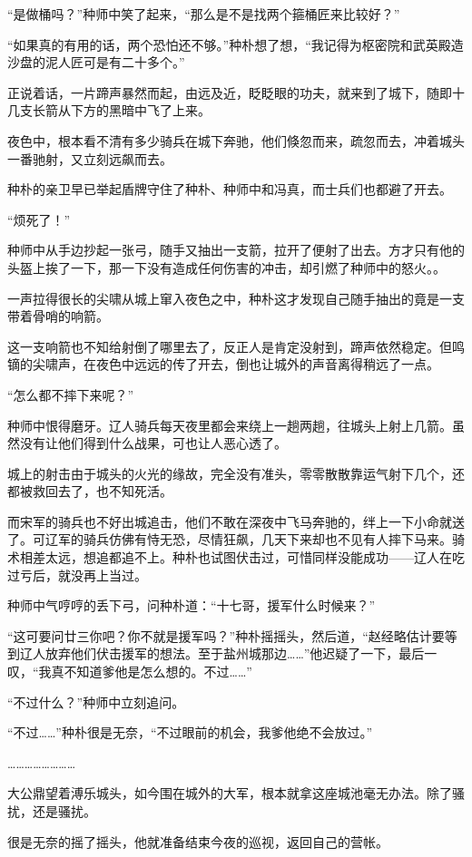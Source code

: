 “是做桶吗？”种师中笑了起来，“那么是不是找两个箍桶匠来比较好？”

“如果真的有用的话，两个恐怕还不够。”种朴想了想，“我记得为枢密院和武英殿造沙盘的泥人匠可是有二十多个。”

正说着话，一片蹄声暴然而起，由远及近，眨眨眼的功夫，就来到了城下，随即十几支长箭从下方的黑暗中飞了上来。

夜色中，根本看不清有多少骑兵在城下奔驰，他们倏忽而来，疏忽而去，冲着城头一番驰射，又立刻远飙而去。

种朴的亲卫早已举起盾牌守住了种朴、种师中和冯真，而士兵们也都避了开去。

“烦死了！”

种师中从手边抄起一张弓，随手又抽出一支箭，拉开了便射了出去。方才只有他的头盔上挨了一下，那一下没有造成任何伤害的冲击，却引燃了种师中的怒火。。

一声拉得很长的尖啸从城上窜入夜色之中，种朴这才发现自己随手抽出的竟是一支带着骨哨的响箭。

这一支响箭也不知给射倒了哪里去了，反正人是肯定没射到，蹄声依然稳定。但鸣镝的尖啸声，在夜色中远远的传了开去，倒也让城外的声音离得稍远了一点。

“怎么都不摔下来呢？”

种师中恨得磨牙。辽人骑兵每天夜里都会来绕上一趟两趟，往城头上射上几箭。虽然没有让他们得到什么战果，可也让人恶心透了。

城上的射击由于城头的火光的缘故，完全没有准头，零零散散靠运气射下几个，还都被救回去了，也不知死活。

而宋军的骑兵也不好出城追击，他们不敢在深夜中飞马奔驰的，绊上一下小命就送了。可辽军的骑兵仿佛有恃无恐，尽情狂飙，几天下来却也不见有人摔下马来。骑术相差太远，想追都追不上。种朴也试图伏击过，可惜同样没能成功——辽人在吃过亏后，就没再上当过。

种师中气哼哼的丢下弓，问种朴道：“十七哥，援军什么时候来？”

“这可要问廿三你吧？你不就是援军吗？”种朴摇摇头，然后道，“赵经略估计要等到辽人放弃他们伏击援军的想法。至于盐州城那边……”他迟疑了一下，最后一叹，“我真不知道爹他是怎么想的。不过……”

“不过什么？”种师中立刻追问。

“不过……”种朴很是无奈，“不过眼前的机会，我爹他绝不会放过。”

……………………

大公鼎望着溥乐城头，如今围在城外的大军，根本就拿这座城池毫无办法。除了骚扰，还是骚扰。

很是无奈的摇了摇头，他就准备结束今夜的巡视，返回自己的营帐。

